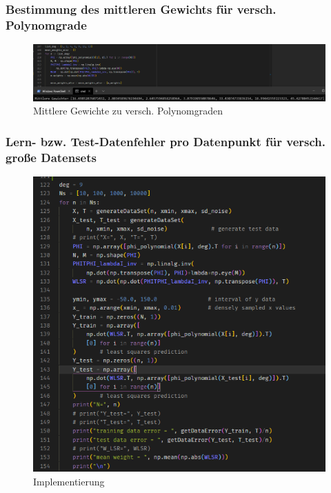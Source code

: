 \subsubsection{Bestimmung des mittleren Gewichts für versch. Polynomgrade}

\begin{figure}[H]
    \centering
    \includegraphics[width=1\linewidth]{sections/v2a1c3.png}
    \caption{Mittlere Gewichte zu versch. Polynomgraden}
\end{figure}

\subsubsection{Lern- bzw. Test-Datenfehler pro Datenpunkt für versch. große Datensets}

\begin{figure}[H]
    \centering
    \includegraphics[width=1\linewidth]{sections/v2a1c4.png}
    \caption{Implementierung}
\end{figure}

